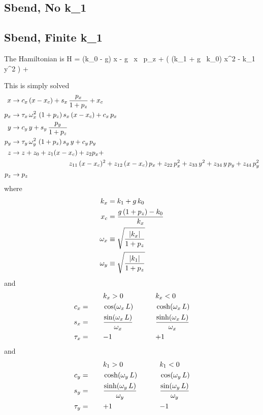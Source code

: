 \documentclass{book}
\begin{document}
\subsection{Sbend, No k\_1}



\subsection{Sbend, Finite k\_1}

The Hamiltonian is
\Begineq
  H = (k_0 - g) x - g \, x \, p_z + 
  \left( (k_1 + g \, k_0) x^2 - k_1 \, y^2 \right) +
\Endeq

This is simply solved
\begin{align}
  x   &\rightarrow c_x \, (x - x_c) + s_x \, \frac{p_x}{1 + p_z} + x_c \CRNO
  p_x &\rightarrow \tau_x \, \om_x^2 \, \, (1 + p_z) \, s_x \, (x -x_c) + c_x \, p_x \CRNO
  y   &\rightarrow c_y \, y + s_y \, \frac{p_y}{1 + p_z} \CRNO
  p_y &\rightarrow \tau_y \, \om_y^2 \, \, (1 + p_z) \, s_y \, y + c_y \, p_y \CRNO
  z   &\rightarrow z + z_0 + z_1 (x - x_c) + z_2 p_x + \CRNO
      &\hspace*{20ex} z_{11} \, (x-x_c)^2 + z_{12} \, (x-x_c) \, p_x + z_{22} \, p_x^2 + 
                   z_{33} \, y^2 + z_{34} \, y \, p_y + z_{44} \, p_y^2 \CRNO
  p_z &\rightarrow p_z \nonumber
\end{align}
where 
\begin{align}
  k_x &= k_1 + g \, k_0 \nonumber \\
  x_c &= \frac{g \, (1 + p_z) - k_0}{k_x} \\
  \omega_x &\equiv \sqrt{\frac{|k_x|}{1 + p_z}} \nonumber \\
  \omega_y &\equiv \sqrt{\frac{|k_1|}{1 + p_z}} \nonumber \\
\end{align}
and
\begin{alignat}{3}
         &\hspace*{5ex}  && k_x > 0          &\hspace*{5ex}& k_x < 0 \nonumber \\
     c_x &=   && \cos  (\omega_x \, L) && \cosh (\omega_x \, L) \\
     s_x &=   && \frac{\sin  (\omega_x \, L)}{\omega_x} && \frac{\sinh (\omega_x \, L)}{\omega_x} \nonumber \\
  \tau_x &=   && {-}1             && {+}1             \nonumber \\
\end{alignat}
and
\begin{alignat}{3}
         &\hspace*{5ex}  && k_1 > 0          &\hspace*{5ex}& k_1 < 0 \nonumber \\
     c_y &=   && \cosh (\omega_y \, L) && \cos  (\omega_y \, L) \\
     s_y &=   && \frac{\sinh (\omega_y \, L)}{\omega_y} && \frac{\sin  (\omega_y \, L)}{\omega_y} \nonumber \\
  \tau_y &=   && {+}1             && {-}1             \nonumber
\end{alignat}
\end{document}
